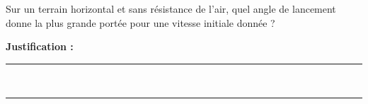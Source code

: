 Sur un terrain horizontal et sans résistance de l'air, quel angle de lancement donne la plus grande portée pour une vitesse initiale donnée ?

\choices

\noindent\textbf{Justification :} \hrulefill \\[2.5ex]
\rule{\linewidth}{0.4pt} \\[2.5ex]
\rule{\linewidth}{0.4pt}
\vfill
